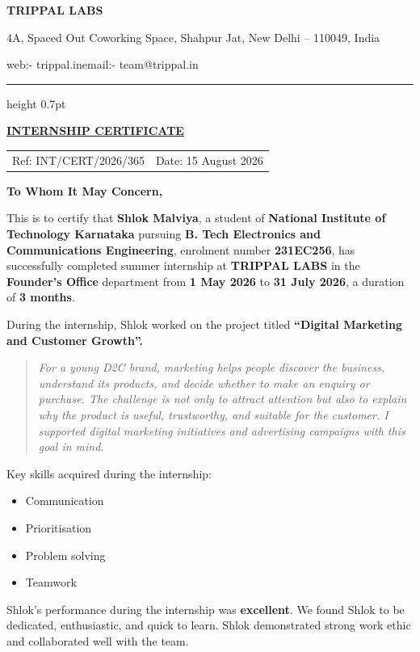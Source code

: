 \documentclass[11pt,a4paper]{article}
\makeatletter
\newcommand{\companyheader}{%
  {\fontsize{16}{19}\selectfont\bfseries TRIPPAL LABS}\par
  \vspace{2pt}
  {\fontsize{9.5}{12}\selectfont\color{muted}
    4A, Spaced Out Coworking Space, Shahpur Jat, New Delhi -- 110049, India\par
    web:- trippal.in\quad email:- team@trippal.in\par}
  \vspace{8pt}
  \hrule height 0.7pt
}
\makeatother
\begin{document}
\begin{center}
  \companyheader
  \vspace{0.75cm}
  {\fontsize{15}{18}\selectfont\bfseries\underline{INTERNSHIP CERTIFICATE}}
\end{center}

\vspace{0.45cm}
\noindent
\begin{tabularx}{\textwidth}{@{}X>{\RaggedLeft\arraybackslash}X@{}}
  Ref: INT/CERT/2026/365 & Date: 15 August 2026
\end{tabularx}

\vspace{0.30cm}
\textbf{To Whom It May Concern,}

This is to certify that \textbf{Shlok Malviya}, a student of \textbf{National Institute of Technology Karnataka} pursuing \textbf{B. Tech Electronics and Communications Engineering}, enrolment number \textbf{231EC256}, has successfully completed summer internship at \textbf{TRIPPAL LABS} in the \textbf{Founder's Office} department from \textbf{1 May 2026} to \textbf{31 July 2026}, a duration of \textbf{3 months}.

During the internship, Shlok worked on the project titled \textbf{``Digital Marketing and Customer Growth''.}

\vspace{-0.15cm}
\begin{quote}
  \color{muted}\itshape
  For a young D2C brand, marketing helps people discover the business, understand its products, and decide whether to make an enquiry or purchase. The challenge is not only to attract attention but also to explain why the product is useful, trustworthy, and suitable for the customer. I supported digital marketing initiatives and advertising campaigns with this goal in mind.
\end{quote}
\vspace{-0.25cm}

Key skills acquired during the internship:
\begin{itemize}[leftmargin=1.35em,itemsep=1pt,topsep=2pt,parsep=0pt]
  \item Communication
  \item Prioritisation
  \item Problem solving
  \item Teamwork
\end{itemize}

Shlok's performance during the internship was \textbf{excellent}. We found Shlok to be dedicated, enthusiastic, and quick to learn. Shlok demonstrated strong work ethic and collaborated well with the team.
\end{document}
